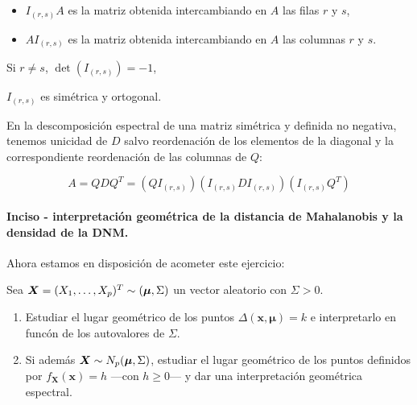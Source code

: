 \begin{itemize}
\item $I_{(r,s)}A$ es la matriz obtenida intercambiando en $A$ las filas $r$ y $s$,
\item $AI_{(r,s)}$ es la matriz obtenida intercambiando en $A$ las columnas $r$ y $s$.
\end{itemize}

\begin{nprop}[Propiedades] \hfill
  \begin{nlist}
  \item Si $r\ne s$, $\det(I_{(r,s)}) = -1$,
  \item $I_{(r,s)}$ es simétrica y ortogonal.
  \end{nlist}
\end{nprop}

En la descomposición espectral de una matriz simétrica y definida no negativa, tenemos unicidad de $D$
salvo reordenación de los elementos de la diagonal y la correspondiente reordenación de las columnas de $Q$:

\[
  A = QDQ^T = (QI_{(r,s)})(I_{(r,s)}DI_{(r,s)})(I_{(r,s)}Q^T)
\]


\paragraph{Inciso - interpretación geométrica de la distancia de Mahalanobis y la densidad de la DNM.}\hfill

Ahora estamos en disposición de acometer este ejercicio:

\begin{ejer}
  Sea $\boldsymbol{X} = (X_1, \dots, X_p)^T \sim (\boldsymbol \mu, \Sigma)$ un vector aleatorio con $\Sigma > 0$. \begin{enumerate}
    \item Estudiar el lugar geométrico de los puntos $\Delta(\boldsymbol x, \boldsymbol \mu) = k$ e interpretarlo en funcón de los autovalores de $\Sigma$.
    \item Si además $\boldsymbol{X} \sim N_p(\boldsymbol \mu, \Sigma)$, estudiar el lugar geométrico de los puntos definidos por $f_{\boldsymbol X}(\boldsymbol x) = h$ —con $h \geq 0$— y dar una interpretación geométrica espectral.
  \end{enumerate}
\end{ejer}

